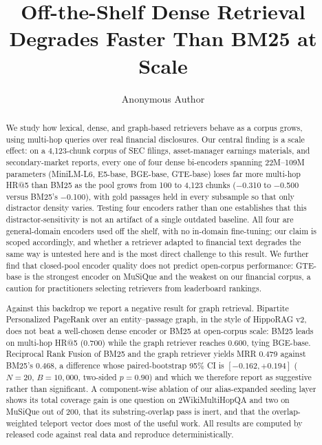 \documentclass[runningheads]{llncs}
\title{Off-the-Shelf Dense Retrieval Degrades Faster Than BM25 at Scale}
\author{Anonymous Author}
\institute{Anonymous Institution \email{anonymous@submission.org}}
\begin{document}
\maketitle

\begin{abstract}
We study how lexical, dense, and graph-based retrievers behave as a corpus grows, using multi-hop queries over real financial disclosures. Our central finding is a scale effect: on a 4{,}123-chunk corpus of SEC filings, asset-manager earnings materials, and secondary-market reports, every one of four dense bi-encoders spanning 22M--109M parameters (MiniLM-L6, E5-base, BGE-base, GTE-base) loses far more multi-hop HR@5 than BM25 as the pool grows from 100 to 4{,}123 chunks ($-$0.310 to $-$0.500 versus BM25's $-$0.100), with gold passages held in every subsample so that only distractor density varies. Testing four encoders rather than one establishes that this distractor-sensitivity is not an artifact of a single outdated baseline. All four are general-domain encoders used off the shelf, with no in-domain fine-tuning; our claim is scoped accordingly, and whether a retriever adapted to financial text degrades the same way is untested here and is the most direct challenge to this result. We further find that closed-pool encoder quality does not predict open-corpus performance: GTE-base is the strongest encoder on MuSiQue and the weakest on our financial corpus, a caution for practitioners selecting retrievers from leaderboard rankings.

Against this backdrop we report a negative result for graph retrieval. Bipartite Personalized PageRank over an entity--passage graph, in the style of HippoRAG v2, does not beat a well-chosen dense encoder or BM25 at open-corpus scale: BM25 leads on multi-hop HR@5 (0.700) while the graph retriever reaches 0.600, tying BGE-base. Reciprocal Rank Fusion of BM25 and the graph retriever yields MRR 0.479 against BM25's 0.468, a difference whose paired-bootstrap 95\% CI is $[-0.162,+0.194]$ ($N{=}20$, $B{=}10{,}000$, two-sided $p=0.90$) and which we therefore report as suggestive rather than significant. A component-wise ablation of our alias-expanded seeding layer shows its total coverage gain is one question on 2WikiMultiHopQA and two on MuSiQue out of 200, that its substring-overlap pass is inert, and that the overlap-weighted teleport vector does most of the useful work. All results are computed by released code against real data and reproduce deterministically.

\end{abstract}
\end{document}
